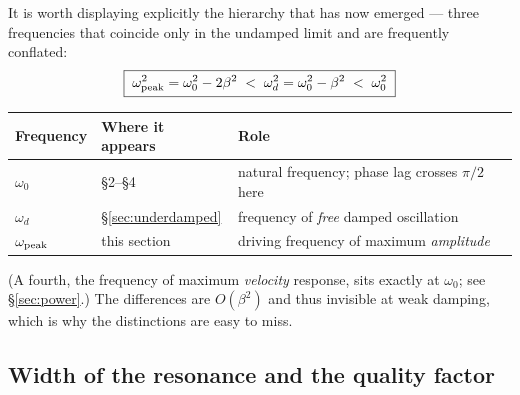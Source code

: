 \documentclass[11pt]{article}
\theoremstyle{plain}
\theoremstyle{definition}
\theoremstyle{remark}
\begin{document}
It is worth displaying explicitly the hierarchy that has now emerged --- three
frequencies that coincide only in the undamped limit and are frequently
conflated:
\begin{equation}
  \boxed{\;
  \omega_{\rm peak}^2 = \omega_0^2 - 2\beta^2
  \;<\;
  \omega_d^2 = \omega_0^2 - \beta^2
  \;<\;
  \omega_0^2
  \;}
\end{equation}
\begin{center}
\begin{tabular}{lll}
\toprule
Frequency & Where it appears & Role \\
\midrule
$\omega_0$ & \S2--\S4 & natural frequency; phase lag crosses $\pi/2$ here \\
$\omega_d$ & \S\ref{sec:underdamped} & frequency of \emph{free} damped oscillation \\
$\omega_{\rm peak}$ & this section & driving frequency of maximum \emph{amplitude} \\
\bottomrule
\end{tabular}
\end{center}
(A fourth, the frequency of maximum \emph{velocity} response, sits exactly at
$\omega_0$; see \S\ref{sec:power}.) The differences are $O(\beta^2)$ and thus
invisible at weak damping, which is why the distinctions are easy to miss.

\subsection{Width of the resonance and the quality factor}
\label{sec:width}
\end{document}
